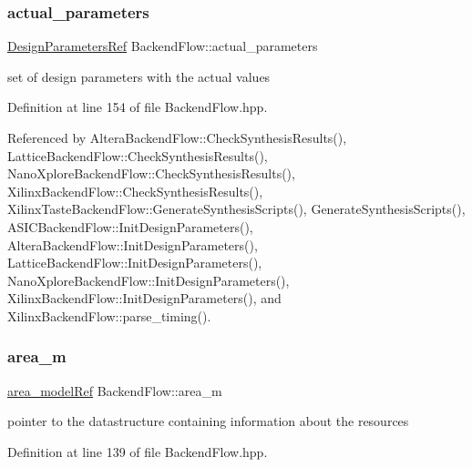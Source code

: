 \subsubsection{\texorpdfstring{actual\+\_\+parameters}{actual\_parameters}}
{\footnotesize\ttfamily \hyperlink{DesignParameters_8hpp_ae36bb1c4c9150d0eeecfe1f96f42d157}{Design\+Parameters\+Ref} Backend\+Flow\+::actual\+\_\+parameters\hspace{0.3cm}{\ttfamily [protected]}}



set of design parameters with the actual values 



Definition at line 154 of file Backend\+Flow.\+hpp.



Referenced by Altera\+Backend\+Flow\+::\+Check\+Synthesis\+Results(), Lattice\+Backend\+Flow\+::\+Check\+Synthesis\+Results(), Nano\+Xplore\+Backend\+Flow\+::\+Check\+Synthesis\+Results(), Xilinx\+Backend\+Flow\+::\+Check\+Synthesis\+Results(), Xilinx\+Taste\+Backend\+Flow\+::\+Generate\+Synthesis\+Scripts(), Generate\+Synthesis\+Scripts(), A\+S\+I\+C\+Backend\+Flow\+::\+Init\+Design\+Parameters(), Altera\+Backend\+Flow\+::\+Init\+Design\+Parameters(), Lattice\+Backend\+Flow\+::\+Init\+Design\+Parameters(), Nano\+Xplore\+Backend\+Flow\+::\+Init\+Design\+Parameters(), Xilinx\+Backend\+Flow\+::\+Init\+Design\+Parameters(), and Xilinx\+Backend\+Flow\+::parse\+\_\+timing().

\mbox{\label{classBackendFlow_a09fc230d74618daa0c27bba53989985b}} 
\subsubsection{\texorpdfstring{area\+\_\+m}{area\_m}}
{\footnotesize\ttfamily \hyperlink{area__model_8hpp_aec11e4e9b1b3afd49a437cb37df0abfb}{area\+\_\+model\+Ref} Backend\+Flow\+::area\+\_\+m\hspace{0.3cm}{\ttfamily [protected]}}



pointer to the datastructure containing information about the resources 



Definition at line 139 of file Backend\+Flow.\+hpp.



